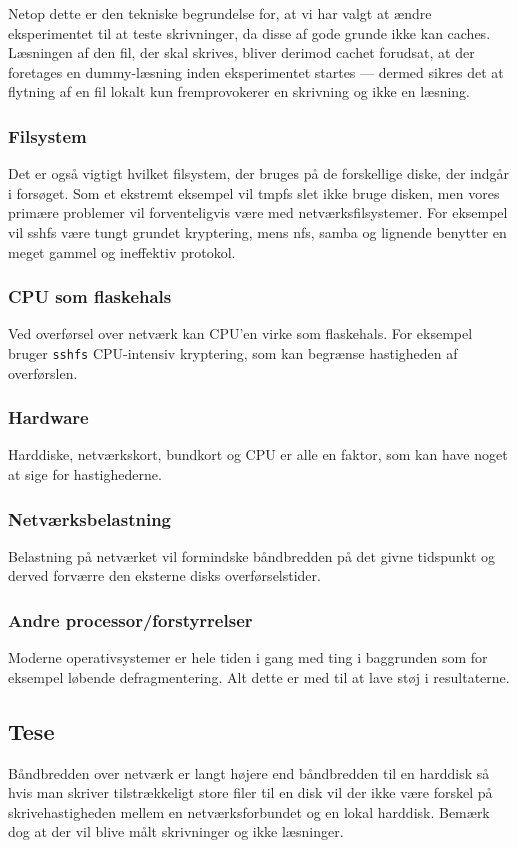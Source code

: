 \documentclass{article}
\begin{document}
Netop dette er den tekniske begrundelse for, at vi har valgt at ændre eksperimentet til at teste skrivninger, da disse af gode grunde ikke kan caches. Læsningen af den fil, der skal skrives, bliver derimod cachet forudsat, at der foretages en dummy-læsning inden eksperimentet startes --- dermed sikres det at flytning af en fil lokalt kun fremprovokerer en skrivning og ikke en læsning.

\subsubsection{Filsystem}
Det er også vigtigt hvilket filsystem, der bruges på de forskellige diske, der indgår i forsøget. Som et ekstremt eksempel vil tmpfs slet ikke bruge disken, men vores primære problemer vil forventeligvis være med netværksfilsystemer. For eksempel vil sshfs være tungt grundet kryptering, mens nfs, samba og lignende benytter en meget gammel og ineffektiv protokol.

\subsubsection{CPU som flaskehals}
Ved overførsel over netværk kan CPU'en virke som flaskehals. For eksempel bruger {\tt sshfs} CPU-intensiv kryptering, som kan begrænse hastigheden af overførslen.

\subsubsection{Hardware}
Harddiske, netværkskort, bundkort og CPU er alle en faktor, som kan have noget at sige for hastighederne.

\subsubsection{Netværksbelastning}
Belastning på netværket vil formindske båndbredden på det givne tidspunkt og derved forværre den eksterne disks overførselstider.

\subsubsection{Andre processor/forstyrrelser}
Moderne operativsystemer er hele tiden i gang med ting i baggrunden som for eksempel løbende defragmentering. Alt dette er med til at lave støj i resultaterne.

\subsection{Tese}
Båndbredden over netværk er langt højere end båndbredden til en harddisk så hvis man skriver tilstrækkeligt store filer til en disk vil der ikke være forskel på skrivehastigheden mellem en netværksforbundet og en lokal harddisk. Bemærk dog at der vil blive målt skrivninger og ikke læsninger.
\end{document}
